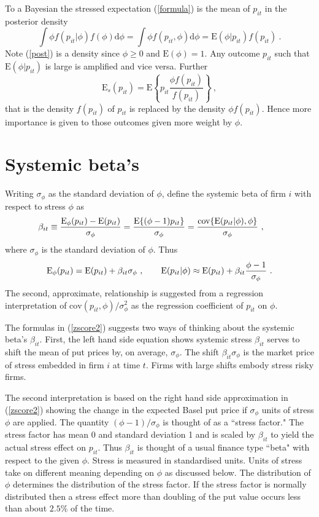 \documentclass[authoryear]{elsarticle}
\newcommand{\E}{\mathrm{E}}
\newcommand{\cov}{\mathrm{cov}}
\newcommand{\de}{\mathrm{d}}
\newcommand{\eref}[1]{(\ref{#1})}
\newcommand{\cq}{\ , \qquad}
\newcommand{\be}[1]{\begin{equation}\label{#1}}
\newcommand{\ee}{\end{equation}}
\begin{document}
  To a Bayesian the stressed expectation \eref{formula}  is the mean of $p_{it}$  in  the posterior density
\be{post}
\int \phi f(p_{it}|\phi) f(\phi)\de \phi=\int \phi f(p_{it},\phi)\de \phi= \E(\phi|p_{it})f(p_{it})\ .
\ee
Note \eref{post} is a density since $\phi\ge 0$ and $\E(\phi)=1$.   Any outcome $p_{it}$ such that $\E(\phi|p_{it})$ is large  is amplified and vice versa.   Further
$$
\E_s(p_{it})  = \E\left\{p_{it} \frac{\phi f(p_{it})}{f(p_{it})}\right\}\ ,
$$
that is the density  $f(p_{it})$ of $p_{it}$  is replaced by  the density $\phi f(p_{it})$.  Hence more importance is given to those outcomes given more weight by $\phi$. 


\section{Systemic beta's}
Writing  $\sigma_{\phi}$ as the standard deviation of $\phi$,  define the systemic beta of firm $i$ with respect to stress $\phi$ as
\be{zscore}
\beta_{it}\equiv \frac{\Es(p_{it})- \E(p_{it})}{\sigma_\phi}= \frac{\E\{(\phi-1)p_{it}\}}{\sigma_\phi}= \frac{ \cov\{\E(p_{it}|\phi),\phi\}}{\sigma_\phi} \cq
\ee
where  $\sigma_\phi$ is the standard deviation of $\phi$.  Thus
\be{zscore2}
\Es(p_{it}) = \E(p_{it}) + \beta_{it}\sigma_\phi\cq \E(p_{it}|\phi) \approx \E(p_{it}) + \beta_{it}\frac{\phi-1}{\sigma_\phi}\ .
\ee
The second, approximate, relationship is suggested from  a regression interpretation of $\cov(p_{it},\phi)/\sigma^2_\phi$ as the regression coefficient of $p_{it}$ on $\phi$.

The formulas in \eref{zscore2} suggests two ways of  thinking about the  systemic beta's  $\beta_{it}$.   First, the left hand side equation shows systemic stress $\beta_{it}$ serves to shift the mean of put prices  by, on average, $\sigma_\phi$.   The shift $\beta_{it}\sigma_\phi$ is the market price of stress embedded in firm $i$ at time $t$.   Firms with large shifts embody stress risky firms.

The second interpretation is based on  the right hand side approximation in \eref{zscore2} showing   the change in the  expected Basel put price if  $\sigma_\phi$ units of stress $\phi$ are applied.  The quantity $(\phi-1)/\sigma_\phi$ is thought of as a ``stress factor."   The stress factor has mean 0 and standard deviation 1 and is scaled by $\beta_{it}$ to yield the actual stress effect on  $p_{it}$.  Thus  $\beta_{it}$ is thought of a usual finance type ``beta" with respect to the given $\phi$.   Stress is measured in standardised units.  Units of stress take on different meaning depending on  $\phi$ as discussed below. The distribution of $\phi$ determines the distribution of the stress factor. If the stress factor is normally distributed then a stress effect more than doubling of the put value  occurs less than about $2.5\%$ of the time. 
\end{document}
